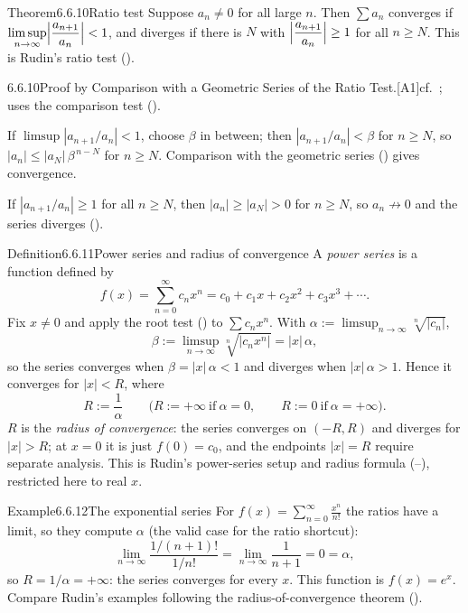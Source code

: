 \documentclass[main.tex]{subfiles}
\begin{document}
\begin{Obj}{Theorem}{6.6.10}{Ratio test}
Suppose $a_n\neq0$ for all large $n$. Then $\sum a_n$ converges if
$\displaystyle\limsup_{n\to\infty}\Bigl|\frac{a_{n+1}}{a_n}\Bigr|<1$, and diverges if there is
$N$ with $\Bigl|\dfrac{a_{n+1}}{a_n}\Bigr|\ge1$ for all $n\ge N$.
This is Rudin's ratio test ().
\end{Obj}
\begin{Prf}{6.6.10}{Proof by Comparison with a Geometric Series of the Ratio Test.}{[A1]\quad cf.\ ; uses the comparison test ().}
\item If $\limsup|a_{n+1}/a_n|<1$, choose $\beta$ in between; then $|a_{n+1}/a_n|<\beta$ for $n\ge N$, so $|a_n|\le|a_N|\,\beta^{\,n-N}$ for $n\ge N$. Comparison with the geometric series () gives convergence.
\item If $|a_{n+1}/a_n|\ge1$ for all $n\ge N$, then $|a_n|\ge|a_N|>0$ for $n\ge N$, so $a_n\not\to0$ and the series diverges ().
\end{Prf}

\begin{Obj}{Definition}{6.6.11}{Power series and radius of convergence}
A \emph{power series} is a function defined by
\[ f(x)=\sum_{n=0}^\infty c_n x^n = c_0+c_1x+c_2x^2+c_3x^3+\cdots . \]
Fix $x\neq0$ and apply the root test () to $\sum c_n x^n$. With
$\alpha:=\limsup_{n\to\infty}\sqrt[n]{|c_n|}$,
\[ \beta:=\limsup_{n\to\infty}\sqrt[n]{|c_n x^n|}=|x|\,\alpha , \]
so the series converges when $\beta=|x|\,\alpha<1$ and diverges when $|x|\,\alpha>1$. Hence it
converges for $|x|<R$, where
\[ R:=\frac{1}{\alpha}\qquad\bigl(R:=+\infty\ \text{if}\ \alpha=0,\qquad R:=0\ \text{if}\ \alpha=+\infty\bigr). \]
$R$ is the \emph{radius of convergence}: the series converges on $(-R,R)$ and diverges for
$|x|>R$; at $x=0$ it is just $f(0)=c_0$, and the endpoints $|x|=R$ require separate analysis.
This is Rudin's power-series setup and radius formula (--), restricted here
to real $x$.
\end{Obj}

\begin{ObjL}{Example}{6.6.12}{The exponential series}
For $f(x)=\displaystyle\sum_{n=0}^\infty\frac{x^n}{n!}$ the ratios have a limit, so they compute
$\alpha$ (the valid case for the ratio shortcut):
\[ \lim_{n\to\infty}\frac{1/(n+1)!}{1/n!}=\lim_{n\to\infty}\frac{1}{n+1}=0=\alpha , \]
so $R=1/\alpha=+\infty$: the series converges for every $x$. This function is $f(x)=e^x$.
Compare Rudin's examples following the radius-of-convergence theorem ().
\end{ObjL}
\end{document}
